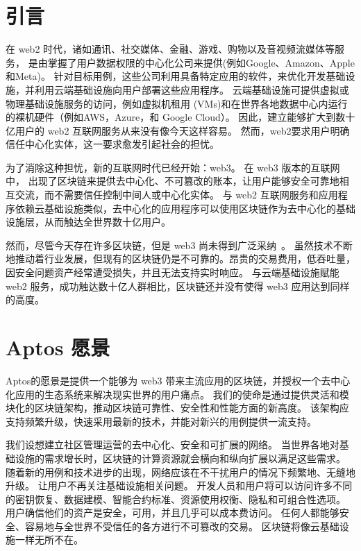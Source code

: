 \documentclass{article}
\begin{document}
\section{引言}

在 web2 时代，诸如通讯、社交媒体、金融、游戏、购物以及音视频流媒体等服务， 是由掌握了用户数据权限的中心化公司来提供(例如Google、Amazon、Apple和Meta)。 针对目标用例，这些公司利用具备特定应用的软件，来优化开发基础设施，并利用云端基础设施向用户部署这些应用程序。 云端基础设施可提供虚拟或物理基础设施服务的访问，例如虚拟机租用 (VMs)和在世界各地数据中心内运行的裸机硬件（例如AWS，Azure，和 Google Cloud）。 因此，建立能够扩大到数十亿用户的 web2 互联网服务从来没有像今天这样容易。 然而，web2要求用户明确信任中心化实体，这一要求愈发引起社会的担忧。

为了消除这种担忧，新的互联网时代已经开始：web3。 在 web3 版本的互联网中， 出现了区块链来提供去中心化、不可篡改的账本，让用户能够安全可靠地相互交流，而不需要信任控制中间人或中心化实体。 与 web2 互联网服务和应用程序依赖云基础设施类似，去中心化的应用程序可以使用区块链作为去中心化的基础设施层，从而触达全世界数十亿用户。

然而，尽管今天存在许多区块链，但是 web3 尚未得到广泛采纳~\cite{a16_state}。 虽然技术不断地推动着行业发展，但现有的区块链仍是不可靠的。昂贵的交易费用，低吞吐量，因安全问题资产经常遭受损失，并且无法支持实时响应。 与云端基础设施赋能 web2 服务，成功触达数十亿人群相比，区块链还并没有使得 web3 应用达到同样的高度。

\section{Aptos 愿景}

Aptos的愿景是提供一个能够为 web3 带来主流应用的区块链，并授权一个去中心化应用的生态系统来解决现实世界的用户痛点。 我们的使命是通过提供灵活和模块化的区块链架构，推动区块链可靠性、安全性和性能方面的新高度。 该架构应支持频繁升级，快速采用最新的技术，并能对新兴的用例提供一流支持。

我们设想建立社区管理运营的去中心化、安全和可扩展的网络。 当世界各地对基础设施的需求增长时，区块链的计算资源就会横向和纵向扩展以满足这些需求。 随着新的用例和技术进步的出现，网络应该在不干扰用户的情况下频繁地、无缝地升级。 让用户不再关注基础设施相关问题。 开发人员和用户将可以访问许多不同的密钥恢复、数据建模、智能合约标准、资源使用权衡、隐私和可组合性选项。 用户确信他们的资产是安全，可用，并且几乎可以成本费访问。 任何人都能够安全、容易地与全世界不受信任的各方进行不可篡改的交易。 区块链将像云基础设施一样无所不在。
\end{document}
